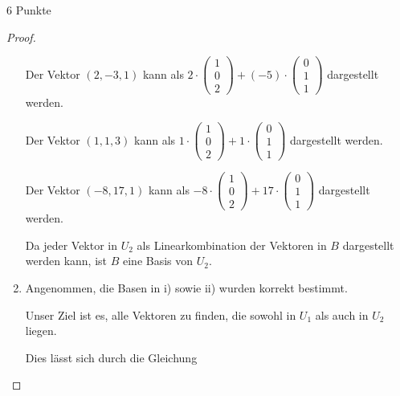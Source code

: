 \documentclass{problemset}
\begin{document}
\begin{problem}{6 Punkte}
\begin{proof}
\begin{enumerate}
              Der Vektor $(2, -3, 1)$ kann als $2 \cdot \begin{pmatrix} 1 \\ 0 \\ 2 \end{pmatrix} + (-5) \cdot \begin{pmatrix} 0 \\ 1 \\ 1 \end{pmatrix}$ dargestellt werden.

              Der Vektor $(1, 1, 3)$ kann als $1 \cdot \begin{pmatrix} 1 \\ 0 \\ 2 \end{pmatrix} + 1 \cdot \begin{pmatrix} 0 \\ 1 \\ 1 \end{pmatrix}$ dargestellt werden.

              Der Vektor $(-8, 17, 1)$ kann als $-8 \cdot \begin{pmatrix} 1 \\ 0 \\ 2 \end{pmatrix} + 17 \cdot \begin{pmatrix} 0 \\ 1 \\ 1 \end{pmatrix}$ dargestellt werden.

              Da jeder Vektor in $U_2$ als Linearkombination der Vektoren in $B$ dargestellt
              werden kann, ist $B$ eine Basis von $U_2$.

        \item Angenommen, die Basen in i) sowie ii) wurden korrekt bestimmt.

              Unser Ziel ist es, alle Vektoren zu finden, die sowohl in \(U_1\) als auch in
              \(U_2\) liegen.

              Dies lässt sich durch die Gleichung


\end{enumerate}
\end{proof}
\end{problem}
\end{document}
